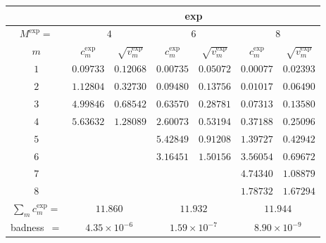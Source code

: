 \begin{tabular}{c|cc|cc|cc|}
&
\multicolumn{6}{|c|}{exp} \\
\hline
$M^{\exp}=$ &
 \multicolumn{2}{|c|}{$4$} &
 \multicolumn{2}{|c|}{$6$} &
 \multicolumn{2}{|c|}{$8$} \\
$m$ &
 $c^{\exp}_m$ & $\sqrt{v^{\exp}_m}$ &
 $c^{\exp}_m$ & $\sqrt{v^{\exp}_m}$ &
 $c^{\exp}_m$ & $\sqrt{v^{\exp}_m}$ \\
$1$ &
 $0.09733$ & $0.12068$ &
 $0.00735$ & $0.05072$ &
 $0.00077$ & $0.02393$ \\
$2$ &
 $1.12804$ & $0.32730$ &
 $0.09480$ & $0.13756$ &
 $0.01017$ & $0.06490$ \\
$3$ &
 $4.99846$ & $0.68542$ &
 $0.63570$ & $0.28781$ &
 $0.07313$ & $0.13580$ \\
$4$ &
 $5.63632$ & $1.28089$ &
 $2.60073$ & $0.53194$ &
 $0.37188$ & $0.25096$ \\
$5$ &
 $~$ & $~$ &
 $5.42849$ & $0.91208$ &
 $1.39727$ & $0.42942$ \\
$6$ &
 $~$ & $~$ &
 $3.16451$ & $1.50156$ &
 $3.56054$ & $0.69672$ \\
$7$ &
 $~$ & $~$ &
 $~$ & $~$ &
 $4.74340$ & $1.08879$ \\
$8$ &
 $~$ & $~$ &
 $~$ & $~$ &
 $1.78732$ & $1.67294$ \\
\hline
$\sum_m c^{\exp}_m=$ &
 \multicolumn{2}{|c|}{$11.860$} &
 \multicolumn{2}{|c|}{$11.932$} &
 \multicolumn{2}{|c|}{$11.944$} \\
badness~$=$ &
 \multicolumn{2}{|c|}{$4.35\times 10^{-6}$} &
 \multicolumn{2}{|c|}{$1.59\times 10^{-7}$} &
 \multicolumn{2}{|c|}{$8.90\times 10^{-9}$} \\
\end{tabular}
